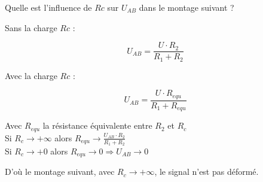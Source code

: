 \begin{question}
Quelle est l’influence de $Rc$ sur $U_{AB}$ dans le montage suivant ?
\end{question}

\begin{reponse}

Sans la charge $Rc$ : 

$$ U_{AB}= \frac{U \cdot R_2}{R_1+R_2}$$

Avec  la charge $Rc$ :

$$ U_{AB}= \frac{U \cdot R_{equ}}{R_1+R_{equ}}$$


Avec $R_{equ}$ la résistance équivalente entre $R_2$ et $R_c$ \\



Si $R_c \rightarrow + \infty$ alors $R_{equ} \rightarrow \frac{U_{AB} \cdot R_2}{R_1+R_2}$ \\

Si $R_c \rightarrow + 0 $ alors $R_{equ} \rightarrow 0 \Rightarrow U_{AB} \rightarrow 0$

\end{reponse}


D'où le montage suivant, avec $R_c \rightarrow + \infty$, le signal n'est pas déformé.



